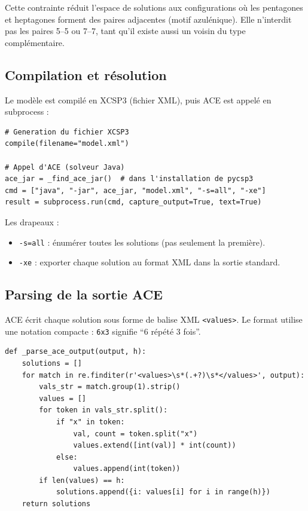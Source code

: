 \documentclass[12pt,a4paper]{article}
\theoremstyle{definition}
\begin{document}
\begin{remarque}
  Cette contrainte réduit l'espace de solutions aux configurations où les pentagones et
  heptagones forment des paires adjacentes (motif azulénique). Elle n'interdit pas les
  paires 5--5 ou 7--7, tant qu'il existe aussi un voisin du type complémentaire.
\end{remarque}

\subsection{Compilation et résolution}

Le modèle est compilé en XCSP3 (fichier XML), puis ACE est appelé en subprocess :

\begin{lstlisting}
# Generation du fichier XCSP3
compile(filename="model.xml")

# Appel d'ACE (solveur Java)
ace_jar = _find_ace_jar()  # dans l'installation de pycsp3
cmd = ["java", "-jar", ace_jar, "model.xml", "-s=all", "-xe"]
result = subprocess.run(cmd, capture_output=True, text=True)
\end{lstlisting}

Les drapeaux :
\begin{itemize}
  \item \texttt{-s=all} : énumérer toutes les solutions (pas seulement la première).
  \item \texttt{-xe} : exporter chaque solution au format XML dans la sortie standard.
\end{itemize}

\subsection{Parsing de la sortie ACE}

ACE écrit chaque solution sous forme de balise XML \texttt{<values>}. Le format utilise
une notation compacte : \texttt{6x3} signifie ``6 répété 3 fois''.

\begin{lstlisting}
def _parse_ace_output(output, h):
    solutions = []
    for match in re.finditer(r'<values>\s*(.+?)\s*</values>', output):
        vals_str = match.group(1).strip()
        values = []
        for token in vals_str.split():
            if "x" in token:
                val, count = token.split("x")
                values.extend([int(val)] * int(count))
            else:
                values.append(int(token))
        if len(values) == h:
            solutions.append({i: values[i] for i in range(h)})
    return solutions
\end{lstlisting}
\end{document}
